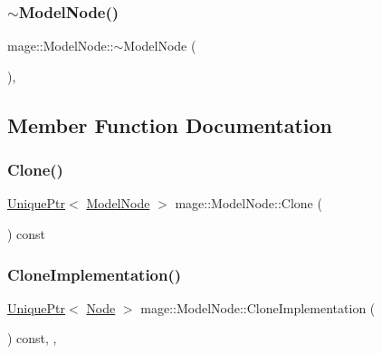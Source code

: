 \hypertarget{classmage_1_1_model_node_a131c0062a1bed3d29fade27e602bec44}{}\label{classmage_1_1_model_node_a131c0062a1bed3d29fade27e602bec44} 
\subsubsection{\texorpdfstring{$\sim$\+Model\+Node()}{~ModelNode()}}
{\footnotesize\ttfamily mage\+::\+Model\+Node\+::$\sim$\+Model\+Node (\begin{DoxyParamCaption}{ }\end{DoxyParamCaption})\hspace{0.3cm}{\ttfamily [virtual]}, {\ttfamily [default]}}



\subsection{Member Function Documentation}
\hypertarget{classmage_1_1_model_node_a766f90e1d626c455ba552a3ded08b948}{}\label{classmage_1_1_model_node_a766f90e1d626c455ba552a3ded08b948} 
\subsubsection{\texorpdfstring{Clone()}{Clone()}}
{\footnotesize\ttfamily \hyperlink{namespacemage_a8c307fbcc33bce9b7f2aa4c26c3b95cf}{Unique\+Ptr}$<$ \hyperlink{classmage_1_1_model_node}{Model\+Node} $>$ mage\+::\+Model\+Node\+::\+Clone (\begin{DoxyParamCaption}{ }\end{DoxyParamCaption}) const}

\hypertarget{classmage_1_1_model_node_a34146201083015276b38240af307417f}{}\label{classmage_1_1_model_node_a34146201083015276b38240af307417f} 
\subsubsection{\texorpdfstring{Clone\+Implementation()}{CloneImplementation()}}
{\footnotesize\ttfamily \hyperlink{namespacemage_a8c307fbcc33bce9b7f2aa4c26c3b95cf}{Unique\+Ptr}$<$ \hyperlink{classmage_1_1_node}{Node} $>$ mage\+::\+Model\+Node\+::\+Clone\+Implementation (\begin{DoxyParamCaption}{ }\end{DoxyParamCaption}) const\hspace{0.3cm}{\ttfamily [override]}, {\ttfamily [private]}, {\ttfamily [virtual]}}

